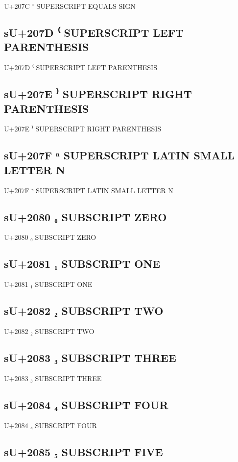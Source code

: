 U+207C ⁼ SUPERSCRIPT EQUALS SIGN

\subsection{sU+207D ⁽ SUPERSCRIPT LEFT PARENTHESIS}

U+207D ⁽ SUPERSCRIPT LEFT PARENTHESIS

\subsection{sU+207E ⁾ SUPERSCRIPT RIGHT PARENTHESIS}

U+207E ⁾ SUPERSCRIPT RIGHT PARENTHESIS

\subsection{sU+207F ⁿ SUPERSCRIPT LATIN SMALL LETTER N}

U+207F ⁿ SUPERSCRIPT LATIN SMALL LETTER N

\subsection{sU+2080 ₀ SUBSCRIPT ZERO}

U+2080 ₀ SUBSCRIPT ZERO

\subsection{sU+2081 ₁ SUBSCRIPT ONE}

U+2081 ₁ SUBSCRIPT ONE

\subsection{sU+2082 ₂ SUBSCRIPT TWO}

U+2082 ₂ SUBSCRIPT TWO

\subsection{sU+2083 ₃ SUBSCRIPT THREE}

U+2083 ₃ SUBSCRIPT THREE

\subsection{sU+2084 ₄ SUBSCRIPT FOUR}

U+2084 ₄ SUBSCRIPT FOUR

\subsection{sU+2085 ₅ SUBSCRIPT FIVE}

